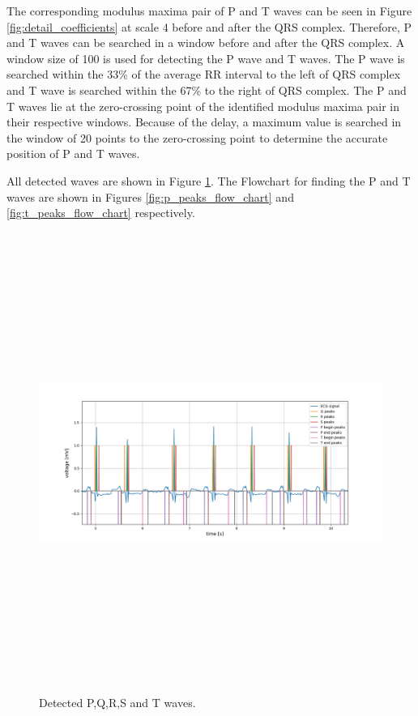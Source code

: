 The corresponding modulus maxima pair of P and T waves can be seen in Figure \ref{fig:detail_coefficients} at scale 4 before and after the QRS complex. Therefore, P and T waves can be searched in a window before and after the QRS complex.
A window size of 100 is used for detecting the P wave and T waves. The P wave is searched within the 33\% of the average RR interval to the left of QRS complex and T wave is searched within the 67\% to the right of QRS complex. The P and T waves lie at the zero-crossing point of the identified modulus maxima pair in their respective windows. Because of the delay, a maximum value is searched in the window of 20 points to the zero-crossing point to determine the accurate position of P and T waves.

All detected waves are shown in Figure \ref{fig:pqrst}. The Flowchart for finding the P and T waves are shown in Figures \ref{fig:p_peaks_flow_chart} and \ref{fig:t_peaks_flow_chart} respectively.


\begin{figure}[htpb]
	\centering
	\includegraphics[width=15cm,height=15cm,keepaspectratio=true]{images/pqrst}
	\caption{
		Detected P,Q,R,S and T waves.
	}
	\label{fig:pqrst}
\end{figure}


